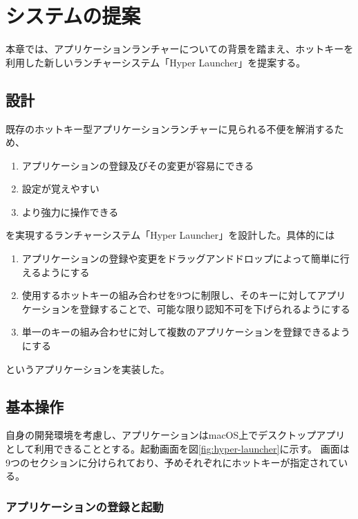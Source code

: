\chapter{システムの提案}
\label{chap:system}

\newpage

本章では、アプリケーションランチャーについての背景を踏まえ、ホットキーを利用した新しいランチャーシステム「Hyper Launcher」を提案する。

\section{設計}

既存のホットキー型アプリケーションランチャーに見られる不便を解消するため、

\begin{enumerate}
	\item アプリケーションの登録及びその変更が容易にできる
	\item 設定が覚えやすい
	\item より強力に操作できる
\end{enumerate}

を実現するランチャーシステム「Hyper Launcher」を設計した。具体的には

\begin{enumerate}
	\item アプリケーションの登録や変更をドラッグアンドドロップによって簡単に行えるようにする
	\item 使用するホットキーの組み合わせを9つに制限し、そのキーに対してアプリケーションを登録することで、可能な限り認知不可を下げられるようにする
	\item 単一のキーの組み合わせに対して複数のアプリケーションを登録できるようにする
\end{enumerate}

というアプリケーションを実装した。

\section{基本操作}

自身の開発環境を考慮し、アプリケーションはmacOS上でデスクトップアプリとして利用できることとする。起動画面を図\ref{fig:hyper-launcher}に示す。
画面は9つのセクションに分けられており、予めそれぞれにホットキーが指定されている。

\subsection{アプリケーションの登録と起動}

